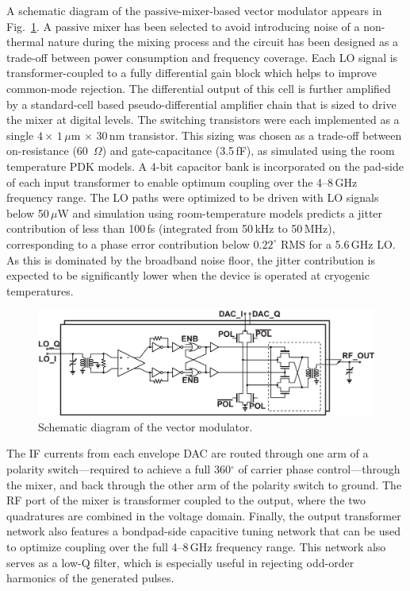 \documentclass[journal]{IEEEtran}
\newcommand{\CR}[1]{{\color{black}#1}}
\newcommand{\CG}[1]{{\color{green}#1}}
\begin{document}
A schematic diagram of the passive-mixer-based vector modulator appears in Fig.~\ref{vectormod}. A passive mixer has been selected to avoid introducing noise of a non-thermal nature during the mixing process and the circuit has been designed as a trade-off between power consumption and \CR{frequency coverage}. Each LO signal is transformer-coupled to a fully differential gain block which helps to improve common-mode rejection.  The differential output of this cell is further amplified by a standard-cell based pseudo-differential amplifier chain that is sized to drive the mixer \CR{at digital levels. The switching transistors were each implemented as a single $4\times\,1\,\mu$m$\,\times\,30\,$nm transistor. This sizing was chosen as a trade-off between on-resistance (60~$\Omega$) and gate-capacitance (3.5\,fF), as simulated using the room temperature PDK models.} \CR{A 4-bit capacitor bank is incorporated on the pad-side of each input transformer to enable optimum coupling over the 4--8\,GHz frequency range.} \CR{The LO paths were optimized to be driven with LO signals below 50\,$\mu$W and  simulation using room-temperature models predicts a jitter contribution of less than 100\,fs (integrated from 50\,kHz to 50\,MHz), corresponding to a phase error contribution below $0.22^\circ$ RMS for a 5.6\,GHz LO. As this is dominated by the \CG{broadband} noise floor, the jitter contribution is expected to be significantly lower when the device is operated at cryogenic temperatures}. 
\begin{figure}[bt!] 
\includegraphics[width=\columnwidth]{Figures/FIGURE_10}
\caption{Schematic diagram of the vector modulator.}\label{vectormod}
\end{figure}

The IF currents from each envelope DAC are routed through one arm of a polarity switch---required to achieve a full 360$^\circ$ of carrier phase control---through the mixer, and back through the other arm of the polarity switch to ground. The \CR{RF port} of the mixer is transformer coupled to the output, where the two quadratures are combined in the voltage domain. Finally,  \CR{the output transformer network} also features a bondpad-side capacitive tuning network that can be used to optimize coupling over the full 4--8\,GHz frequency range. \CR{This network also serves as a low-Q filter, which is especially useful in rejecting odd-order harmonics of the generated pulses.}
\end{document}
